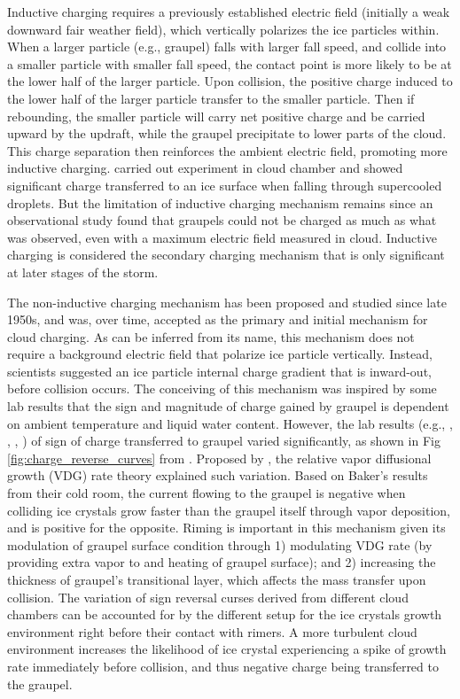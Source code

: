 Inductive charging requires a previously established electric field (initially a weak downward fair weather field), which vertically polarizes the ice particles within. When a larger particle (e.g., graupel) falls with larger fall speed, and collide into a smaller particle with smaller fall speed, the contact point is more likely to be at the lower half of the larger particle. Upon collision, the positive charge induced to the lower half of the larger particle transfer to the smaller particle. Then if rebounding, the smaller particle will carry net positive charge and be carried upward by the updraft, while the graupel precipitate to lower parts of the cloud. This charge separation then reinforces the ambient electric field, promoting more inductive charging. \cite{brooks1994experimental} carried out experiment in cloud chamber and showed significant charge transferred to an ice surface when falling through supercooled droplets. But the limitation of inductive charging mechanism remains since an observational study \cite{christian1980airborne} found that graupels could not be charged as much as what was observed, even with a maximum electric field measured in cloud. Inductive charging is considered the secondary charging mechanism that is only significant at later stages of the storm.

The non-inductive charging mechanism has been proposed and studied since late 1950s, and was, over time, accepted as the primary and initial mechanism for cloud charging. As can be inferred from its name, this mechanism does not require a background electric field that polarize ice particle vertically. Instead, scientists suggested an ice particle internal charge gradient that is inward-out, before collision occurs. The conceiving of this mechanism was inspired by some lab results \cite{takahashi1978riming} that the sign and magnitude of charge gained by graupel is dependent on ambient temperature and liquid water content. However, the lab results (e.g., \cite{takahashi1978riming}, \cite{saunders1998laboratory}, \cite{pereyra2000laboratory}, \cite{saunders2006laboratory}) of sign of charge transferred to graupel varied significantly, as shown in Fig \ref{fig:charge_reverse_curves} from \cite{saunders2008charge}. Proposed by \cite{baker1987influence}, the relative vapor diffusional growth (VDG) rate theory explained such variation. Based on Baker's results from their cold room, the current flowing to the graupel is negative when colliding ice crystals grow faster than the graupel itself through vapor deposition, and is positive for the opposite. Riming is important in this mechanism given its modulation of graupel surface condition through 1) modulating VDG rate (by providing extra vapor to and heating of graupel surface); and 2) increasing the thickness of graupel's transitional layer, which affects the mass transfer upon collision. The variation of sign reversal curses derived from different cloud chambers can be accounted for by the different setup for the ice crystals growth environment right before their contact with rimers. A more turbulent cloud environment increases the likelihood of ice crystal experiencing a spike of growth rate immediately before collision, and thus negative charge being transferred to the graupel.
